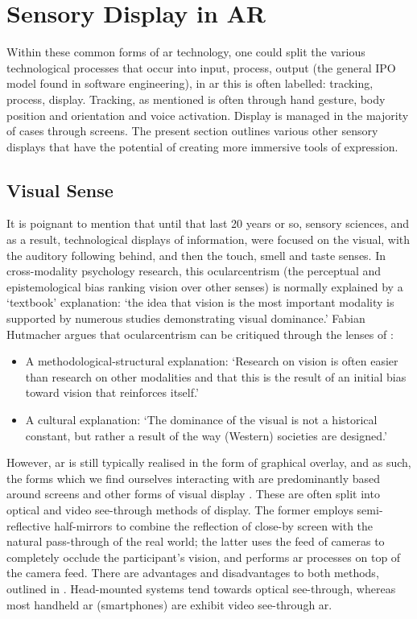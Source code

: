 \section{Sensory Display in AR}\label{sec: ar-sensory}
Within these common forms of \gls{ar} technology, one could split the various technological processes that occur into input, process, output (the general IPO model found in software engineering), in \gls{ar} this is often labelled: tracking, process, display. Tracking, as mentioned is often through hand gesture, body position and orientation and voice activation. Display is managed in the majority of cases through screens. The present section outlines various other sensory displays that have the potential of creating more immersive tools of expression.

\subsection{Visual Sense}\label{sec: ar-sensory-visual}
It is poignant to mention that until that last 20 years or so, sensory sciences, and as a result, technological displays of information, were focused on the visual, with the auditory following behind, and then the touch, smell and taste senses. In cross-modality psychology research, this ocularcentrism (the perceptual and epistemological bias ranking vision over other senses) is normally explained by a `textbook' explanation: `the idea that vision is the most important modality is supported by numerous studies demonstrating visual dominance.' Fabian Hutmacher argues that ocularcentrism can be critiqued through the lenses of \citeyearpar{hutmacher2019}: 

\begin{itemize}
    \item A methodological-structural explanation: `Research on vision is often easier than research on other modalities and that this is the result of an initial bias toward vision that reinforces itself.'
    \item A cultural explanation: `The dominance of the visual is not a historical constant, but rather a result of the way (Western) societies are designed.'
\end{itemize}

However, \gls{ar} is still typically realised in the form of graphical overlay, and as such, the forms which we find ourselves interacting with are predominantly based around screens and other forms of visual display \citep{dey2018}. These are often split into optical and video see-through methods of display. The former employs semi-reflective half-mirrors to combine the reflection of close-by screen with the natural pass-through of the real world; the latter uses the feed of cameras to completely occlude the participant's vision, and performs \gls{ar} processes on top of the camera feed. There are advantages and disadvantages to both methods, outlined in \citep{rolland2000}. Head-mounted systems tend towards optical see-through, whereas most handheld \gls{ar} (smartphones) are exhibit video see-through \gls{ar}.

